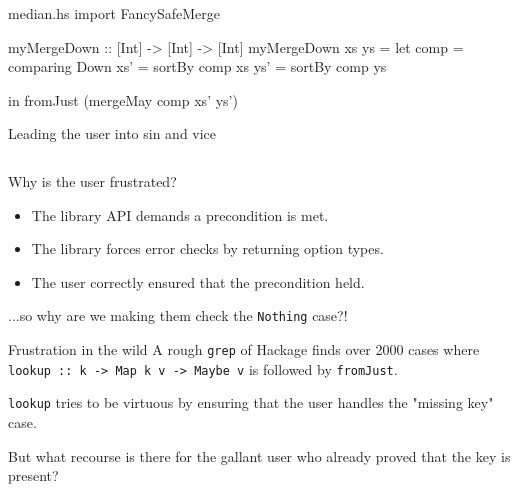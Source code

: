 \documentclass{beamer}
\begin{document}
\usebackgroundtemplate{}

\begin{filecontents*}{median.hs}
import FancySafeMerge

myMergeDown :: [Int] -> [Int] -> [Int]
myMergeDown xs ys =
    let comp = comparing Down
        xs' = sortBy comp xs
        ys' = sortBy comp ys

    in  fromJust (mergeMay comp xs' ys')
\end{filecontents*}
\begin{frame}{Leading the user into sin and vice}
\inputminted{haskell}{median.hs}
\end{frame}

\begin{frame}{Why is the user frustrated?}
  \begin{itemize}
    \pause\item The library API demands a precondition is met.
  \pause\item The library forces error checks by returning option types.
  \pause\item The user correctly ensured that the precondition held.
  \end{itemize}
  \pause...so why are we making them check the \texttt{Nothing} case?!
\end{frame}

\begin{frame}{Frustration in the wild}
  A rough \texttt{grep} of Hackage finds over 2000 cases where \\
  {\scriptsize\texttt{lookup :: k -> Map k v -> Maybe v}} is followed by
  {\scriptsize\texttt{fromJust}}.
  \bigskip
  
  {\scriptsize\texttt{lookup}} tries to be virtuous by ensuring that the user handles the
  "missing key" case.
  \bigskip

  But what recourse is there for the gallant user who
  already proved that the key is present?
\end{frame}
\end{document}
